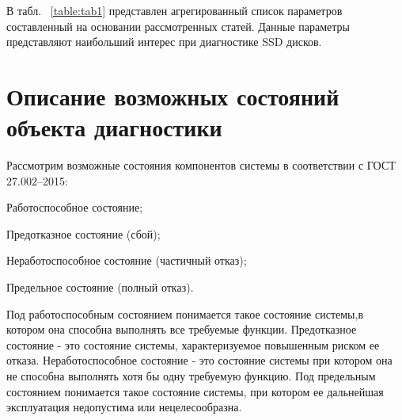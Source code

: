 В табл.  ~\ref{table:tab1} представлен агрегированный список параметров составленный на основании рассмотренных статей. Данные параметры представляют наибольший интерес при диагностике SSD дисков. 

\section{Описание возможных состояний объекта диагностики}
Рассмотрим возможные состояния компонентов системы в соответствии с ГОСТ 27.002–2015:
\begin{itemize*}
	\item{Работоспособное состояние;}
	\item{Предотказное состояние (сбой);}
	\item{Неработоспособное состояние (частичный отказ);}
	\item{Предельное состояние (полный отказ).}
\end{itemize*}
Под работоспособным состоянием понимается такое состояние системы,в котором она способна выполнять все требуемые функции. 
Предотказное состояние - это состояние системы, характеризуемое повышенным риском ее отказа. 
Неработоспособное состояние - это состояние системы при котором она не способна выполнять хотя бы одну требуемую функцию.
Под предельным состоянием понимается такое состояние системы, при котором ее дальнейшая эксплуатация недопустима или нецелесообразна. 

